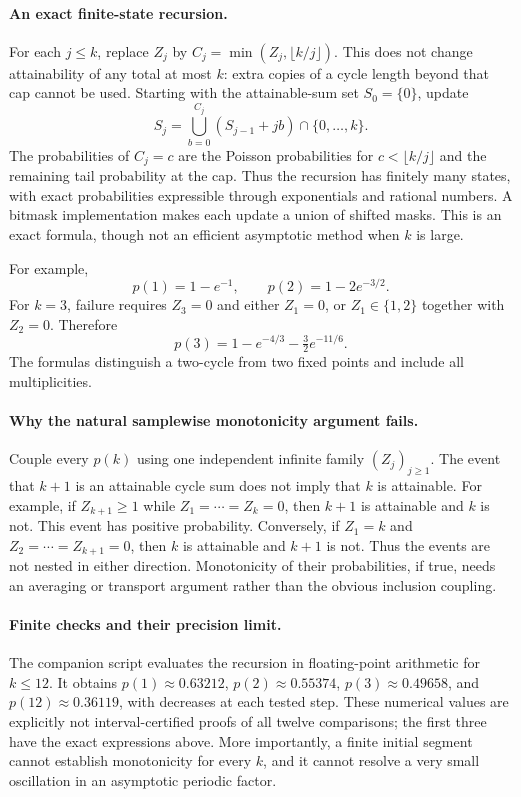 \documentclass[11pt,a4paper]{article}
\begin{document}
\paragraph{An exact finite-state recursion.}
For each $j\leq k$, replace $Z_j$ by $C_j=\min(Z_j,\lfloor k/j\rfloor)$. This does not change attainability of any total at most $k$: extra copies of a cycle length beyond that cap cannot be used. Starting with the attainable-sum set $S_0=\{0\}$, update
\[
 S_j=\bigcup_{b=0}^{C_j}(S_{j-1}+jb)\cap\{0,\ldots,k\}.
\]
The probabilities of $C_j=c$ are the Poisson probabilities for $c<\lfloor k/j\rfloor$ and the remaining tail probability at the cap. Thus the recursion has finitely many states, with exact probabilities expressible through exponentials and rational numbers. A bitmask implementation makes each update a union of shifted masks. This is an exact formula, though not an efficient asymptotic method when $k$ is large.

For example,
\[
 p(1)=1-e^{-1},\qquad p(2)=1-2e^{-3/2}.
\]
For $k=3$, failure requires $Z_3=0$ and either $Z_1=0$, or $Z_1\in\{1,2\}$ together with $Z_2=0$. Therefore
\[
 p(3)=1-e^{-4/3}-\tfrac32e^{-11/6}.
\]
The formulas distinguish a two-cycle from two fixed points and include all multiplicities.

\paragraph{Why the natural samplewise monotonicity argument fails.}
Couple every $p(k)$ using one independent infinite family $(Z_j)_{j\geq1}$. The event that $k+1$ is an attainable cycle sum does not imply that $k$ is attainable. For example, if $Z_{k+1}\geq1$ while $Z_1=\cdots=Z_k=0$, then $k+1$ is attainable and $k$ is not. This event has positive probability. Conversely, if $Z_1=k$ and $Z_2=\cdots=Z_{k+1}=0$, then $k$ is attainable and $k+1$ is not. Thus the events are not nested in either direction. Monotonicity of their probabilities, if true, needs an averaging or transport argument rather than the obvious inclusion coupling.

\paragraph{Finite checks and their precision limit.}
The companion script evaluates the recursion in floating-point arithmetic for $k\leq12$. It obtains $p(1)\approx0.63212$, $p(2)\approx0.55374$, $p(3)\approx0.49658$, and $p(12)\approx0.36119$, with decreases at each tested step. These numerical values are explicitly not interval-certified proofs of all twelve comparisons; the first three have the exact expressions above. More importantly, a finite initial segment cannot establish monotonicity for every $k$, and it cannot resolve a very small oscillation in an asymptotic periodic factor.
\end{document}
